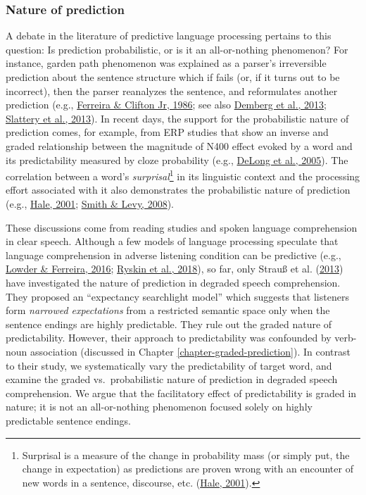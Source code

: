 \documentclass[a4paper, nobind]{templates/ociamthesis}
\begin{document}
\hypertarget{nature-of-prediction}{%
\subsubsection{Nature of prediction}\label{nature-of-prediction}}

\noindent
A debate in the literature of predictive language processing pertains to this question: Is prediction probabilistic, or is it an all-or-nothing phenomenon?
For instance, garden path phenomenon was explained as a parser's irreversible prediction about the sentence structure
which if fails (or, if it turns out to be incorrect), then the parser reanalyzes the sentence, and reformulates another prediction (e.g., \protect\hyperlink{ref-Ferreira1986}{Ferreira \& Clifton Jr, 1986}; see also \protect\hyperlink{ref-Demberg2013}{Demberg et al., 2013}; \protect\hyperlink{ref-Slattery2013}{Slattery et al., 2013}).
In recent days, the support for the probabilistic nature of prediction comes, for example, from ERP studies that show an inverse and graded relationship between the magnitude of N400 effect evoked by a word and its predictability measured by cloze probability (e.g., \protect\hyperlink{ref-Delong2005}{DeLong et al., 2005}).
The correlation between a word's \emph{surprisal}\footnote{Surprisal is a measure of the change in probability mass (or simply put, the change in expectation) as predictions are proven wrong with an encounter of new words in a sentence, discourse, etc. (\protect\hyperlink{ref-Hale2001}{Hale, 2001}).} in its linguistic context and the processing effort associated with it also demonstrates the probabilistic nature of prediction (e.g., \protect\hyperlink{ref-Hale2001}{Hale, 2001}; \protect\hyperlink{ref-Smith2008}{Smith \& Levy, 2008}).

These discussions come from reading studies and spoken language comprehension in clear speech.
Although a few models of language processing speculate that language comprehension in adverse listening condition can be predictive (e.g., \protect\hyperlink{ref-Lowder2016}{Lowder \& Ferreira, 2016}; \protect\hyperlink{ref-Ryskin2018}{Ryskin et al., 2018}),
so far, only Strauß et al. (\protect\hyperlink{ref-Strauss2013}{2013}) have investigated the nature of prediction in degraded speech comprehension.
They proposed an ``expectancy searchlight model'' which suggests that listeners form \emph{narrowed expectations} from a restricted semantic space only when the sentence endings are highly predictable.
They rule out the graded nature of predictability.
However, their approach to predictability was confounded by verb-noun association
(discussed in Chapter \ref{chapter-graded-prediction}).
In contrast to their study, we systematically vary the predictability of target word,
and examine the graded vs.~probabilistic nature of prediction in degraded speech comprehension.
We argue that the facilitatory effect of predictability is graded in nature;
it is not an all-or-nothing phenomenon focused solely on highly predictable sentence endings.
\end{document}
